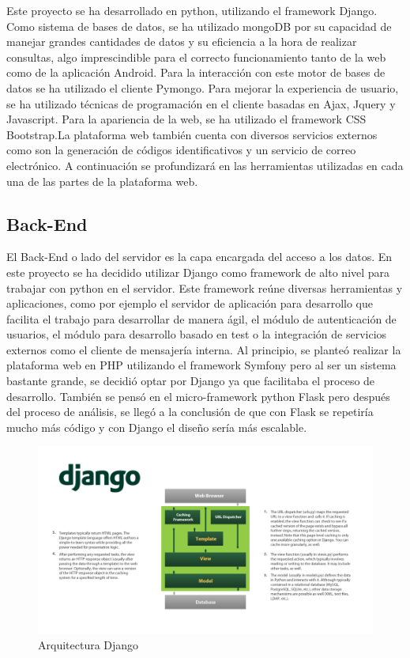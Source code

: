 \documentclass[a4paper,11pt]{book}
\begin{document}
Este proyecto se ha desarrollado en python, utilizando el framework Django. Como sistema de bases de datos, se ha utilizado mongoDB por su capacidad de manejar grandes cantidades de datos y su eficiencia a la hora de realizar consultas, algo imprescindible para el correcto funcionamiento tanto de la web como de la aplicación Android. Para la interacción con este motor de bases de datos se ha utilizado el cliente Pymongo. Para mejorar la experiencia de usuario, se ha utilizado técnicas de programación en el cliente basadas en Ajax, Jquery y Javascript. Para la apariencia de la web, se ha utilizado el framework CSS Bootstrap.La plataforma web también cuenta con diversos servicios externos como son la generación de códigos identificativos y un servicio de correo electrónico. A continuación se profundizará en las herramientas utilizadas en cada una de las partes de la plataforma web.

 



\subsection{Back-End}

El Back-End o lado del servidor es la capa encargada del acceso a los datos. En este proyecto se ha decidido utilizar Django\cite{dj} como framework de alto nivel para trabajar con python en el servidor. Este framework reúne diversas herramientas y aplicaciones, como por ejemplo el servidor de aplicación para desarrollo que facilita el trabajo para desarrollar de manera ágil, el módulo de autenticación de usuarios, el módulo para desarrollo basado en test o la integración de servicios externos como el cliente de mensajería interna. Al principio, se planteó realizar la plataforma web en PHP utilizando el framework Symfony pero al ser un sistema bastante grande, se decidió optar por Django ya que facilitaba el proceso de desarrollo. También se pensó en el micro-framework python Flask\cite{fl} pero después del proceso de análisis, se llegó a la conclusión de que con Flask se repetiría mucho más código y con Django el diseño sería más escalable.

\begin{figure}[H] 
\centering 
\includegraphics[scale=0.55]{imagenes/desarrollo_herramienta/django.png}
\caption{ Arquitectura Django\cite{djA}  }  
\end{figure} 
\end{document}
